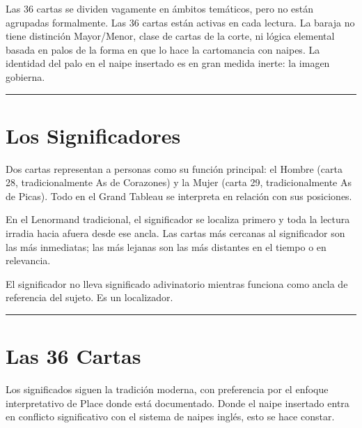 Las 36 cartas se dividen vagamente en ámbitos temáticos, pero no están agrupadas formalmente. Las 36 cartas están activas en cada lectura. La baraja no tiene distinción Mayor/Menor, clase de cartas de la corte, ni lógica elemental basada en palos de la forma en que lo hace la cartomancia con naipes. La identidad del palo en el naipe insertado es en gran medida inerte: la imagen gobierna.

\begin{center}\rule{0.5\linewidth}{0.5pt}\end{center}

\section{Los Significadores}\label{the-significators}

Dos cartas representan a personas como su función principal: el Hombre (carta 28, tradicionalmente As de Corazones) y la Mujer (carta 29, tradicionalmente As de Picas). Todo en el Grand Tableau se interpreta en relación con sus posiciones.

En el Lenormand tradicional, el significador se localiza primero y toda la lectura irradia hacia afuera desde ese ancla. Las cartas más cercanas al significador son las más inmediatas; las más lejanas son las más distantes en el tiempo o en relevancia.

El significador no lleva significado adivinatorio mientras funciona como ancla de referencia del sujeto. Es un localizador.

\begin{center}\rule{0.5\linewidth}{0.5pt}\end{center}

\section{Las 36 Cartas}\label{the-36-cards}

Los significados siguen la tradición moderna, con preferencia por el enfoque interpretativo de Place donde está documentado. Donde el naipe insertado entra en conflicto significativo con el sistema de naipes inglés, esto se hace constar.

